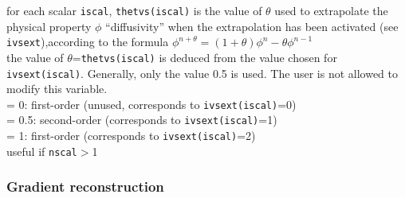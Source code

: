 {for each scalar {\tt iscal}, {\tt thetvs(iscal)} is the value of $\theta$ used to
extrapolate the physical property $\phi$ ``diffusivity'' when the extrapolation has
been activated (see {\tt ivsext}),according to the
formula $\phi^{n+\theta}=(1+\theta)\phi^n-\theta \phi^{n-1}$\\
the value of $\theta$={\tt thetvs(iscal)} is deduced from the value chosen for
{\tt ivsext(iscal)}. Generally, only the value 0.5 is used. The user is not
allowed to modify this variable.\\
\hspace*{1.3cm}= 0: first-order (unused, corresponds to
{\tt ivsext(iscal)}=0)\\
\hspace*{1.3cm}= 0.5: second-order (corresponds to {\tt ivsext(iscal)}=1) \\
\hspace*{1.3cm}= 1: first-order (corresponds to {\tt ivsext(iscal)}=2) \\
useful if {\tt nscal}$>$1}


\subsubsection{Gradient reconstruction}

